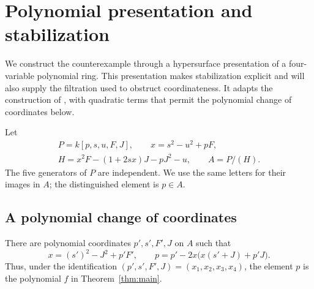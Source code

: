 \section{Polynomial presentation and stabilization}\label{sec:construction}

We construct the counterexample through a hypersurface presentation of a
four-variable polynomial ring.  This
presentation makes stabilization explicit and will also supply the filtration
used to obstruct coordinateness.
It adapts the construction of \cite[Section~2]{Cancellation2026}, with
quadratic terms that permit the polynomial change of coordinates below.

Let
\begin{equation}\label{con:presentation}
 \begin{gathered}
 P=k[p,s,u,F,J],\qquad x=s^2-u^2+pF,\\
 H=x^2F-(1+2sx)J-pJ^2-u,\qquad A=P/(H).
 \end{gathered}
\end{equation}
The five generators of $P$ are independent.  We use the same letters for their
images in $A$; the distinguished element is $p\in A$.

\subsection{A polynomial change of coordinates}

\begin{proposition}\label{prop:polynomial}
There are polynomial coordinates $p',s',F',J$ on $A$ such that
\begin{equation}\label{con:candidate}
 x=(s')^2-J^2+p'F',\qquad
 p=p'-2x\bigl(x(s'+J)+p'J\bigr).
\end{equation}
Thus, under the identification $(p',s',F',J)=(x_1,x_2,x_3,x_4)$,
the element $p$ is the polynomial $f$ in Theorem~\ref{thm:main}.
\end{proposition}

